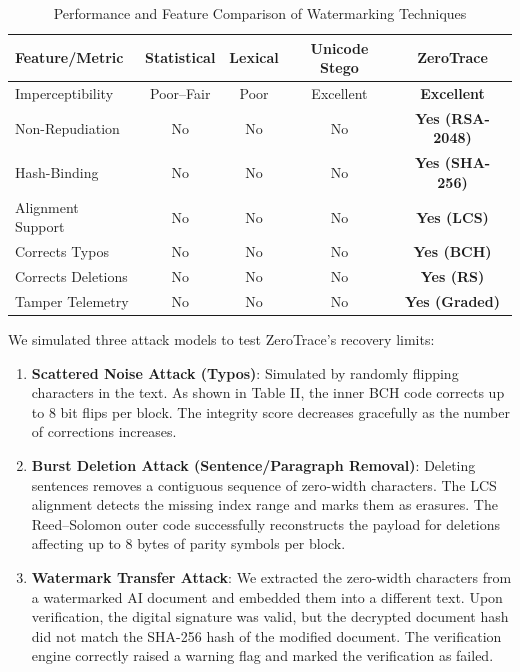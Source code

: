 \documentclass[conference]{IEEEtran}
\begin{document}
\begin{table}[htbp]
\caption{Performance and Feature Comparison of Watermarking Techniques}
\centering
\begin{tabular}{lcccc}
\toprule
\textbf{Feature/Metric} & \textbf{Statistical} & \textbf{Lexical} & \textbf{Unicode Stego} & \textbf{ZeroTrace} \\
\midrule
Imperceptibility & Poor--Fair & Poor & Excellent & \textbf{Excellent} \\
Non-Repudiation & No & No & No & \textbf{Yes (RSA-2048)} \\
Hash-Binding & No & No & No & \textbf{Yes (SHA-256)} \\
Alignment Support & No & No & No & \textbf{Yes (LCS)} \\
Corrects Typos & No & No & No & \textbf{Yes (BCH)} \\
Corrects Deletions & No & No & No & \textbf{Yes (RS)} \\
Tamper Telemetry & No & No & No & \textbf{Yes (Graded)} \\
\bottomrule
\end{tabular}
\label{tab:comparison}
\end{table}

We simulated three attack models to test ZeroTrace's recovery limits:
\begin{enumerate}
    \item \textbf{Scattered Noise Attack (Typos)}: Simulated by randomly flipping characters in the text. As shown in Table II, the inner BCH code corrects up to 8 bit flips per block. The integrity score decreases gracefully as the number of corrections increases.
    \item \textbf{Burst Deletion Attack (Sentence/Paragraph Removal)}: Deleting sentences removes a contiguous sequence of zero-width characters. The LCS alignment detects the missing index range and marks them as erasures. The Reed--Solomon outer code successfully reconstructs the payload for deletions affecting up to 8 bytes of parity symbols per block.
    \item \textbf{Watermark Transfer Attack}: We extracted the zero-width characters from a watermarked AI document and embedded them into a different text. Upon verification, the digital signature was valid, but the decrypted document hash did not match the SHA-256 hash of the modified document. The verification engine correctly raised a warning flag and marked the verification as failed.
\end{enumerate}
\end{document}
